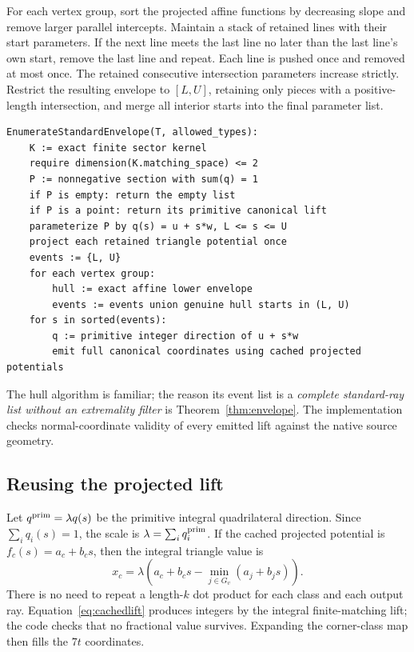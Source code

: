 \documentclass[11pt]{article}
\theoremstyle{definition}
\theoremstyle{remark}
\begin{document}
For each vertex group, sort the projected affine functions by decreasing
slope and remove larger parallel intercepts. Maintain a stack of retained
lines with their start parameters. If the next line meets the last line no
later than the last line's own start, remove the last line and repeat. Each
line is pushed once and removed at most once. The retained consecutive
intersection parameters increase strictly. Restrict the resulting envelope
to $[L,U]$, retaining only pieces with a positive-length intersection, and
merge all interior starts into the final parameter list.

\begin{lstlisting}[caption={Mathematical pseudocode for the proved branch.}]
EnumerateStandardEnvelope(T, allowed_types):
    K := exact finite sector kernel
    require dimension(K.matching_space) <= 2
    P := nonnegative section with sum(q) = 1
    if P is empty: return the empty list
    if P is a point: return its primitive canonical lift
    parameterize P by q(s) = u + s*w, L <= s <= U
    project each retained triangle potential once
    events := {L, U}
    for each vertex group:
        hull := exact affine lower envelope
        events := events union genuine hull starts in (L, U)
    for s in sorted(events):
        q := primitive integer direction of u + s*w
        emit full canonical coordinates using cached projected potentials
\end{lstlisting}

The hull algorithm is familiar; the reason its event list is a \emph{complete
standard-ray list without an extremality filter} is
Theorem~\ref{thm:envelope}. The implementation checks normal-coordinate
validity of every emitted lift against the native source geometry.

\subsection{Reusing the projected lift}

Let $q^{\rm prim}=\lambda q(s)$ be the primitive integral quadrilateral
direction. Since $\sum_iq_i(s)=1$, the scale is
$\lambda=\sum_iq_i^{\rm prim}$. If the cached projected potential is
$f_c(s)=a_c+b_cs$, then the integral triangle value is
\begin{equation}
 x_c=\lambda\left(a_c+b_cs-
                   \min_{j\in G_v}(a_j+b_js)\right).
 \label{eq:cachedlift}
\end{equation}
There is no need to repeat a length-$k$ dot product for each class and each
output ray. Equation~\eqref{eq:cachedlift} produces integers by the integral
finite-matching lift; the code checks that no fractional value survives.
Expanding the corner-class map then fills the $7t$ coordinates.
\end{document}
